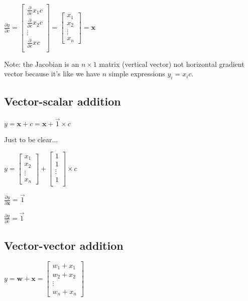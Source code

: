 \documentclass[11pt]{article}
\begin{document}
$\frac{\partial y}{\partial c} = \begin{bmatrix}
           \frac{\partial}{\partial c} x_{1} c \\
           \frac{\partial}{\partial c} x_{2} c \\
           \vdots \\
           \frac{\partial}{\partial c} x_{} c \\
         \end{bmatrix} = \begin{bmatrix}
           x_{1} \\
           x_{2} \\
           \vdots \\
           x_{n} 
         \end{bmatrix} = \mathbf{x}$

Note: the Jacobian is an $n \times 1$ matrix (vertical vector) not horizontal gradient vector because it's like we have $n$ simple expressions $y_i = x_i c$.

\subsection{Vector-scalar addition}

$y = \mathbf{x} + c = \mathbf{x} + \vec{1} \times c$

Just to be clear...

$y = \begin{bmatrix}
           x_{1} \\
           x_{2} \\
           \vdots \\
           x_{n}
         \end{bmatrix}
         + \begin{bmatrix}
           1\\
           1\\
           \vdots \\
           1\\
         \end{bmatrix} \times c$

$\frac{\partial y}{\partial \mathbf{x}} = \vec{1}$

$\frac{\partial y}{\partial c} = \vec{1}$

\subsection{Vector-vector addition}

$y = \mathbf{w} + \mathbf{x} = \begin{bmatrix}
           w_{1} + x_{1} \\
           w_{2} + x_{2}\\
           \vdots \\
           w_{n} + x_{n}
         \end{bmatrix}$
\end{document}
